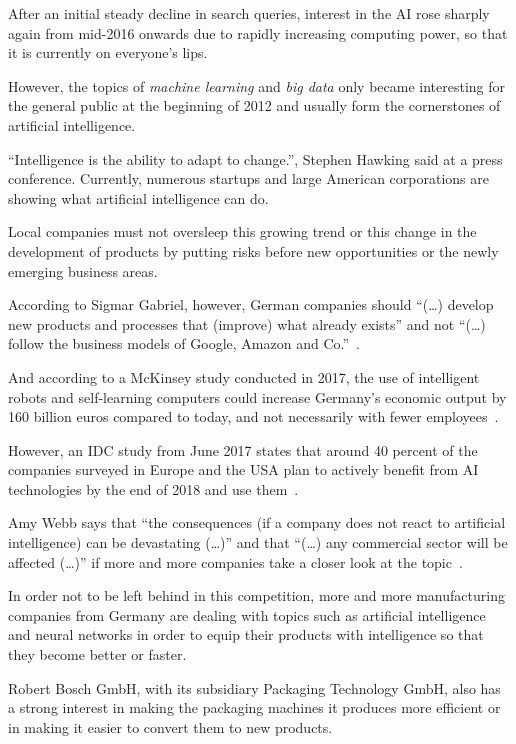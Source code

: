 After an initial steady decline in search queries, interest in the AI rose sharply again from mid-2016 onwards due to
rapidly increasing computing power, so that it is currently on everyone's lips.

However, the topics of \textit{machine learning} and \textit{big data} only became interesting for the general public
at the beginning of 2012 and usually form the cornerstones of artificial intelligence.

\enquote{Intelligence is the ability to adapt to change.}, Stephen Hawking said at a press conference. Currently,
numerous startups and large American corporations are showing what artificial intelligence can do.

Local companies must not oversleep this growing trend or this change in the development of products by putting risks
before new opportunities or the newly emerging business areas.

According to Sigmar Gabriel, however, German companies should \enquote{(\ldots) develop new products and processes that
(improve) what already exists} and not \enquote{(\ldots) follow the business models of Google, Amazon and
Co.}~\cite{article_einleitung_ww_sg}.

And according to a McKinsey study conducted in 2017, the use of intelligent robots and self-learning computers could
increase Germany's economic output by 160 billion euros compared to today, and not necessarily with fewer
employees~\cite{online_einleitung_mckinsey}.

However, an IDC study from June 2017 states that around 40 percent of the companies surveyed in Europe and the USA plan
to actively benefit from AI technologies by the end of 2018 and use them~\cite{article_grundlagen_salesforce}.

Amy Webb says that \enquote{the consequences (if a company does not react to artificial intelligence) can be devastating
(\ldots)} and that \enquote{(\ldots) any commercial sector will be affected (\ldots)} if more and more companies take a
closer look at the topic~\cite{article_einleitung_dub_aw}.

In order not to be left behind in this competition, more and more manufacturing companies from Germany are dealing with
topics such as artificial intelligence and neural networks in order to equip their products with intelligence so that
they become better or faster.

Robert Bosch GmbH, with its subsidiary Packaging Technology GmbH, also has a strong interest in making the packaging
machines it produces more efficient or in making it easier to convert them to new products.

